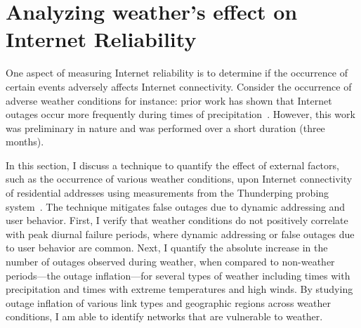 
\chapter{Analyzing weather's effect on Internet Reliability}
\label{cpt:weather}

One aspect of measuring Internet reliability is to determine if the occurrence of certain events adversely affects Internet connectivity. Consider the occurrence of adverse weather conditions for instance: prior work has shown that Internet outages occur more frequently during times of precipitation~\cite{pingin}. However, this work was preliminary in nature and was performed over a short duration (three months). %

In this section, I discuss a technique to quantify the effect of
external factors, such as the occurrence of various weather
conditions, upon Internet connectivity of residential addresses using
measurements from the Thunderping probing system~\cite{pingin}. The
technique mitigates false outages due to dynamic addressing and user
behavior. First, I verify that weather conditions do not positively
correlate with peak diurnal failure periods, where dynamic addressing
or false outages due to user behavior are common. Next, I quantify
the absolute increase in the number of outages observed during
weather, when compared to non-weather periods---the outage
inflation---for several types of weather including times with
precipitation and times with extreme temperatures and high winds. By
studying outage inflation of various link types and geographic regions
across weather conditions, I am able to identify networks that are
vulnerable to weather.

